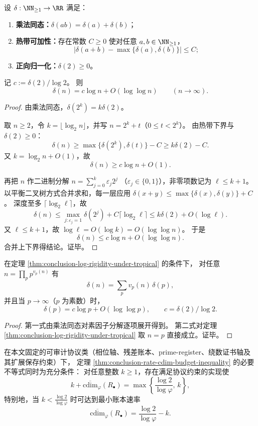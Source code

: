 \begin{theorem}[乘法同态与热带可加性的对数刚性]\label{thm:conclusion-log-rigidity-under-tropical}
设 \(\delta:\NN_{\ge 1}\to\RR\) 满足：
\begin{enumerate}
  \item \textbf{乘法同态：}\(\delta(ab)=\delta(a)+\delta(b)\)；
  \item \textbf{热带可加性：}存在常数 \(C\ge 0\) 使对任意 \(a,b\in\NN_{\ge 1}\)，
  \[
  \bigl|\delta(a+b)-\max\{\delta(a),\delta(b)\}\bigr|\le C;
  \]
  \item \textbf{正向归一化：}\(\delta(2)\ge 0\)。
\end{enumerate}
记 \(c:=\delta(2)/\log 2\)。
则
\[
\delta(n)=c\log n+O(\log\log n)\qquad(n\to\infty).
\]
\end{theorem}
\begin{proof}
由乘法同态，\(\delta(2^k)=k\delta(2)\)。

取 \(n\ge 2\)，令 \(k=\lfloor\log_2 n\rfloor\)，并写 \(n=2^k+t\)（\(0\le t<2^k\)）。
由热带下界与 \(\delta(2)\ge 0\)：
\[
\delta(n)\ge \max\{\delta(2^k),\delta(t)\}-C\ge k\delta(2)-C.
\]
又 \(k=\log_2 n+O(1)\)，故
\[
\delta(n)\ge c\log n+O(1).
\]

再把 \(n\) 作二进制分解
\(
n=\sum_{j=0}^{k}\varepsilon_j2^j
\)
（\(\varepsilon_j\in\{0,1\}\)），非零项数记为 \(\ell\le k+1\)。
以平衡二叉树方式合并求和，每一层应用
\(
\delta(x+y)\le \max\{\delta(x),\delta(y)\}+C
\)。
深度至多 \(\lceil\log_2\ell\rceil\)，故
\[
\delta(n)\le \max_{j:\varepsilon_j=1}\delta(2^j)+C\lceil\log_2\ell\rceil
\le k\delta(2)+O(\log\ell).
\]
又 \(\ell\le k+1\)，故 \(\log\ell=O(\log k)=O(\log\log n)\)。
于是
\[
\delta(n)\le c\log n+O(\log\log n).
\]
合并上下界得结论。证毕。
\end{proof}

\begin{corollary}[素数权重的渐近对数律]\label{cor:conclusion-prime-weight-log-law}
在定理 \ref{thm:conclusion-log-rigidity-under-tropical} 的条件下，
对任意 \(n=\prod_p p^{v_p(n)}\) 有
\[
\delta(n)=\sum_{p}v_p(n)\,\delta(p),
\]
并且当 \(p\to\infty\)（\(p\) 为素数）时，
\[
\delta(p)=c\log p+O(\log\log p),\qquad c=\delta(2)/\log 2.
\]
\end{corollary}
\begin{proof}
第一式由乘法同态对素因子分解逐项展开得到。
第二式对定理 \ref{thm:conclusion-log-rigidity-under-tropical} 取 \(n=p\) 直接成立。证毕。
\end{proof}

\begin{conjecture}[圆维预算前沿的线性最优性]\label{conj:conclusion-circle-dimension-linear-frontier}
在本文固定的可审计协议类（相位轴、残差账本、prime-register、绕数证书轴及其扩展保存约束）下，
定理 \ref{thm:conclusion-rate-cdim-budget-inequality} 的必要不等式同时为充分条件：
对任意整数 \(k\ge 1\)，存在满足协议约束的实现使
\[
k+\overline{\mathrm{cdim}}_{\varphi}(R_\bullet)
=
\max\!\left\{\frac{\log 2}{\log\varphi},\,k\right\},
\]
特别地，当 \(k<\frac{\log 2}{\log\varphi}\) 时可达到最小账本速率
\[
\overline{\mathrm{cdim}}_{\varphi}(R_\bullet)
=
\frac{\log 2}{\log\varphi}-k.
\]
\end{conjecture}

